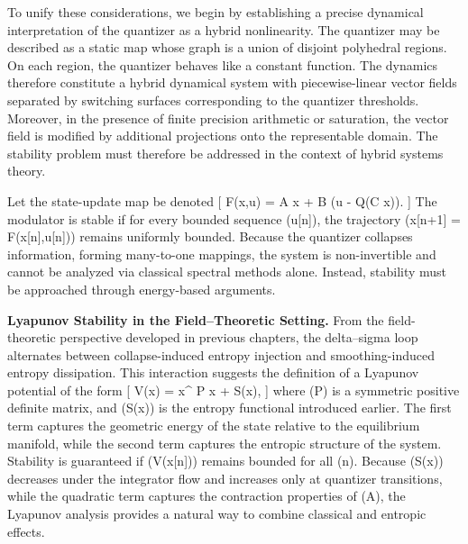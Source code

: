 To unify these considerations, we begin by establishing a precise dynamical interpretation of the quantizer as a hybrid nonlinearity. The quantizer may be described as a static map whose graph is a union of disjoint polyhedral regions. On each region, the quantizer behaves like a constant function. The dynamics therefore constitute a hybrid dynamical system with piecewise-linear vector fields separated by switching surfaces corresponding to the quantizer thresholds. Moreover, in the presence of finite precision arithmetic or saturation, the vector field is modified by additional projections onto the representable domain. The stability problem must therefore be addressed in the context of hybrid systems theory.

Let the state-update map be denoted
[
F(x,u) = A x + B (u - Q(C x)).
]
The modulator is stable if for every bounded sequence (u[n]), the trajectory (x[n+1] = F(x[n],u[n])) remains uniformly bounded. Because the quantizer collapses information, forming many-to-one mappings, the system is non-invertible and cannot be analyzed via classical spectral methods alone. Instead, stability must be approached through energy-based arguments.

\medskip

\textbf{Lyapunov Stability in the Field–Theoretic Setting.}
From the field-theoretic perspective developed in previous chapters, the delta–sigma loop alternates between collapse-induced entropy injection and smoothing-induced entropy dissipation. This interaction suggests the definition of a Lyapunov potential of the form
[
V(x) = x^{\top} P x + \alpha S(x),
]
where (P) is a symmetric positive definite matrix, and (S(x)) is the entropy functional introduced earlier. The first term captures the geometric energy of the state relative to the equilibrium manifold, while the second term captures the entropic structure of the system. Stability is guaranteed if (V(x[n])) remains bounded for all (n). Because (S(x)) decreases under the integrator flow and increases only at quantizer transitions, while the quadratic term captures the contraction properties of (A), the Lyapunov analysis provides a natural way to combine classical and entropic effects.

